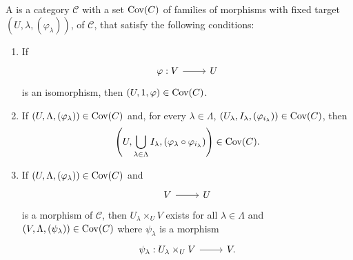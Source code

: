 \documentclass [11 pt, oneside] {article}
\begin{document}
\begin{definition}\label{sitestacksproject}\text{}
A  is a category $\mathscr{C}$ with a set $\operatorname{Cov}(\relax{C})$ of families of morphisms with fixed target $(U,\lambda,(\varphi_{\lambda}))$,  of $\mathscr{C}$, that satisfy the following conditions:
\begin{enumerate}[leftmargin=*]
	\item If 
		\[
		\begin{tikzcd}
			\varphi:V\ar[r]& U
		\end{tikzcd}
		\]
		is an isomorphism, then $(U,1,\varphi) \in \operatorname{Cov}(\relax{C})$.
	\item If $(U,\Lambda,(\varphi_{\lambda})) \in \operatorname{Cov}(\relax{C})$ and, for every $\lambda\in \Lambda$, $(U_{\lambda}, I_{\lambda}, (\varphi_{i_{\lambda}})) \in \operatorname{Cov}(\relax{C})$, then 
		\[
			\left( U,\bigcup_{\lambda\in\Lambda}I_{\lambda}, (\varphi_{\lambda}\circ \varphi_{i_{\lambda}}) \right) \in \operatorname{Cov}(\relax{C}).
			\]
	\item If $(U,\Lambda,(\varphi_{\lambda})) \in \operatorname{Cov}(\relax{C})$ and 
		\[
		\begin{tikzcd}
			V\ar[r]&U
		\end{tikzcd}
		\]
		is a morphism of $\mathscr{C}$, then $U_{\lambda}\times_{U}V$ exists for all $\lambda\in\Lambda$ and $(V,\Lambda, (\psi_{\lambda}))\in \operatorname{Cov}(\relax{C})$ where $\psi_{\lambda}$ is a morphism
		\[
		\begin{tikzcd}
			\psi_{\lambda} : U_{\lambda}\times_{U}V\ar[r]& V.
		\end{tikzcd}
		\]
\end{enumerate}
\end{definition}
\fi

\end{document}
